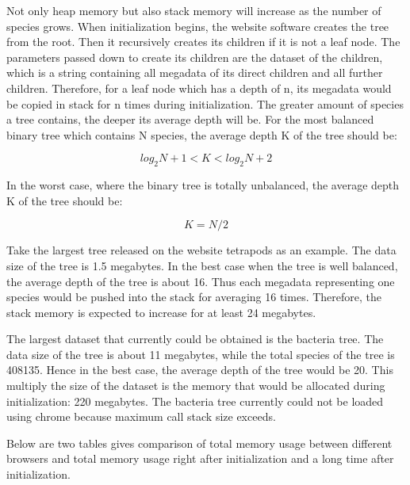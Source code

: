 \documentclass[MSc]{icldt}
\begin{document}
Not only heap memory but also stack memory will increase as the number of species grows. When initialization begins, the website software creates the tree from the root. Then it recursively creates its children if it is not a leaf node. The parameters passed down to create its children are the dataset of the children, which is a string containing all megadata of its direct children and all further children. Therefore, for a leaf node which has a depth of n, its megadata would be copied in stack for n times during initialization. The greater amount of species a tree contains, the deeper its average depth will be. For the most balanced binary tree which contains N species, the average depth K of the tree should be:

\begin{equation*}
log_2 N + 1 < K < log_2 N + 2
\end{equation*}

In the worst case, where the binary tree is totally unbalanced, the average depth K of the tree should be:

 \begin{equation*}
	K = N/2
\end{equation*}

Take the largest tree released on the website tetrapods as an example. The data size of the tree is 1.5 megabytes. In the best case when the tree is well balanced, the average depth of the tree is about 16. Thus each megadata representing one species would be pushed into the stack for averaging 16 times. Therefore, the stack memory is expected to increase for at least 24 megabytes.

 The largest dataset that currently could be obtained is the bacteria tree. The data size of the tree is about 11 megabytes, while the total species of the tree is 408135. Hence in the best case, the average depth of the tree would be 20. This multiply the size of the dataset is the memory that would be allocated during initialization: 220 megabytes. The bacteria tree currently could not be loaded using chrome because maximum call stack size exceeds. 
 
 Below are two tables gives comparison of total memory usage between different browsers and total memory usage right after initialization and a long time after initialization.
 
\end{document}
